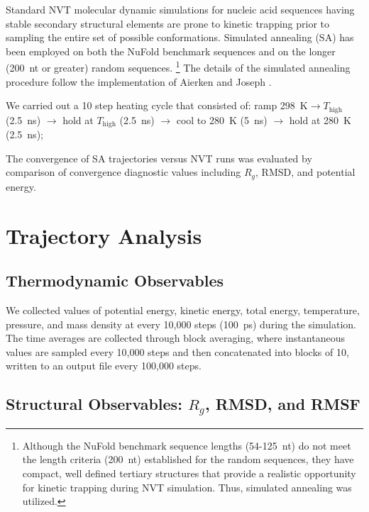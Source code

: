 Standard NVT molecular dynamic simulations for nucleic acid 
sequences having stable secondary structural elements are prone to kinetic 
trapping prior to sampling the entire set of possible conformations. 
Simulated annealing (SA) has been employed on both the NuFold 
benchmark sequences and on the longer (200~nt or greater) random sequences.
\footnote{Although the NuFold benchmark sequence lengths (54-125~nt) do not meet 
the length criteria (200~nt) established for the random sequences, they have 
compact, well defined tertiary structures that provide a realistic opportunity 
for kinetic trapping during NVT simulation. Thus, simulated annealing was utilized.}
The details of the simulated annealing procedure follow the implementation 
of Aierken and Joseph \cite{Aierken2024}.

We carried out a 10 step heating cycle that consisted of: ramp 298~K$\rightarrow T_\text{high}$ (2.5~ns) $\rightarrow$ hold at $T_\text{high}$ (2.5~ns) $\rightarrow$
cool to 280~K (5~ns) $\rightarrow$ hold at 280~K (2.5~ns);

The convergence of SA trajectories versus NVT runs was evaluated by comparison of
convergence diagnostic values including $R_g$, RMSD, and potential energy.






\section{Trajectory Analysis}
\label{sec:traj_analysis}

\subsection{Thermodynamic Observables}


We collected values of potential energy, kinetic energy, total energy, temperature, pressure, and mass density at every 10,000 steps (100~ps) during the simulation. 
The time averages are collected through block averaging, where instantaneous values are sampled every 10,000 steps and then concatenated into blocks of 10, written to an output file every 100,000 steps.


\subsection{Structural Observables: $R_g$, RMSD, and RMSF}
\label{sec:structural_obs}

